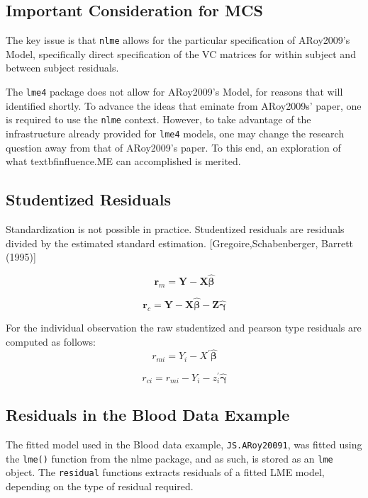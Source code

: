 \documentclass[12pt, a4paper]{report}
\theoremstyle{plain}
\theoremstyle{definition}
\theoremstyle{remark}
\begin{document}
	\subsection{Important Consideration for MCS}
	
	The key issue is that \texttt{nlme} allows for the particular specification of ARoy2009's Model, specifically direct specification of the VC matrices for within subject and between subject residuals.
	
	The \texttt{lme4} package does not allow for ARoy2009's Model, for reasons that will identified shortly.
	To advance the ideas that eminate from ARoy2009s' paper, one is required to use the \texttt{nlme} context. However, to take advantage of the infrastructure already provided for \texttt{lme4} models, one may change the research question away from that of ARoy2009's paper. 
	To this end, an exploration of what textbf{influence.ME} can accomplished is merited.
	\subsection{Studentized Residuals}
	Standardization is not possible in practice. Studentized residuals are residuals divided by the estimated standard estimation.
	[Gregoire,Schabenberger, Barrett (1995)]
	
	\[\boldsymbol{r}_{m} = \boldsymbol{Y} -  \boldsymbol{X} \boldsymbol{\hat{\beta}} \]
	
	\[\boldsymbol{r}_{c} = \boldsymbol{Y} -  \boldsymbol{X} \boldsymbol{\hat{\beta}} -  \boldsymbol{Z} \boldsymbol{\hat{\gamma}}\]
	
	For the individual observation the raw studentized and pearson type residuals are computed as follows:
	\[r_{mi} =Y_{i} -X^{\prime} \boldsymbol{\hat{\beta}}\]
	
	\[r_{ci} = r_{mi} - Y_{i} - z_{i}^{\prime} \boldsymbol{\hat{\gamma}}\]
	
	
	\subsection{Residuals in the Blood Data Example}
	The fitted model used in the Blood data example, \texttt{JS.ARoy20091}, was fitted using the \texttt{lme()} function from the nlme package, and as such, is stored as an \texttt{lme} object. The \texttt{residual} functions extracts residuals of a fitted LME model, depending on the type of residual required.
	
\end{document}
